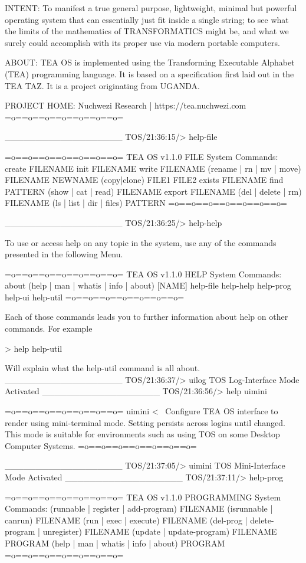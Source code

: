 \documentclass[a4paper, 18pt]{book} %
\begin{document}
{{{\begin{tcbverbatim}[title=Sample OUTPUT 1 from TEA OS v1.1.0]
INTENT: To manifest a true general purpose, lightweight, minimal but powerful operating system that can essentially just fit inside a single string; to see what the limits of the mathematics of TRANSFORMATICS might be, and what we surely could accomplish with its proper use via modern portable computers.

ABOUT: TEA OS is implemented using the Transforming Executable Alphabet (TEA) programming language. It is based on a specification first laid out in the TEA TAZ. It is a project originating from UGANDA.

PROJECT HOME: Nuchwezi Research | https://tea.nuchwezi.com
=o==o==o==o==o==o==o=

___________________
TOS/21:36:15/> 
help-file

=o==o==o==o==o==o==o=
TEA OS v1.1.0 FILE System Commands:
create FILENAME
init FILENAME
write FILENAME
(rename | rn | mv | move) FILENAME NEWNAME
(copy|clone) FILE1 FILE2
exists FILENAME
find PATTERN
(show | cat | read) FILENAME
export FILENAME
(del | delete | rm) FILENAME
(ls | list | dir | files) PATTERN
=o==o==o==o==o==o==o=

___________________
TOS/21:36:25/> 
help-help

To use or access help on any topic in the system, use any of the commands presented in the following Menu.

=o==o==o==o==o==o==o=
TEA OS v1.1.0 HELP System Commands:
about
(help | man | whatis | info | about) [NAME]
help-file
help-help
help-prog
help-ui
help-util
=o==o==o==o==o==o==o=

Each of those commands leads you to further information about help on other commands. For example

> help help-util

Will explain what the help-util command is all about.
___________________
TOS/21:36:37/> 
uilog
TOS Log-Interface Mode Activated
___________________
TOS/21:36:56/> 
help uimini

=o==o==o==o==o==o==o=
uimini <~ Configure TEA OS interface to render using mini-terminal mode. Setting persists across logins until changed. This mode is suitable for environments such as using TOS on some Desktop Computer Systems.
=o==o==o==o==o==o==o=

___________________
TOS/21:37:05/> 
uimini
TOS Mini-Interface Mode Activated
___________________
TOS/21:37:11/> 
help-prog

=o==o==o==o==o==o==o=
TEA OS v1.1.0 PROGRAMMING System Commands:
(runnable | register | add-program) FILENAME
(isrunnable | canrun) FILENAME
(run | exec | execute) FILENAME
(del-prog | delete-program | unregister) FILENAME
(update | update-program) FILENAME
PROGRAM
(help | man | whatis | info | about) PROGRAM
=o==o==o==o==o==o==o=


\end{tcbverbatim}}}}
\end{document}
